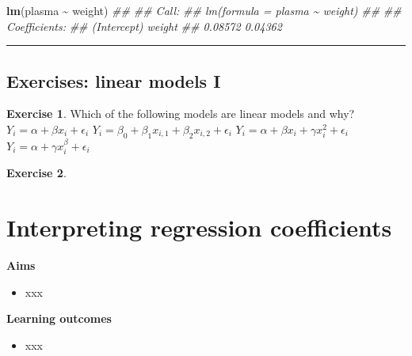 \documentclass[
]{book}
\newenvironment{Shaded}{\begin{snugshade}}{\end{snugshade}}
\newcommand{\CommentTok}[1]{\textcolor[rgb]{0.56,0.35,0.01}{\textit{#1}}}
\newcommand{\KeywordTok}[1]{\textcolor[rgb]{0.13,0.29,0.53}{\textbf{#1}}}
\newcommand{\NormalTok}[1]{#1}
\newcommand{\OperatorTok}[1]{\textcolor[rgb]{0.81,0.36,0.00}{\textbf{#1}}}
\newcommand{\StringTok}[1]{\textcolor[rgb]{0.31,0.60,0.02}{#1}}
\providecommand{\tightlist}{%
  \setlength{\itemsep}{0pt}\setlength{\parskip}{0pt}}
\theoremstyle{definition}
\theoremstyle{definition}
\theoremstyle{definition}
\newtheorem{exercise}{Exercise}[chapter]
\theoremstyle{remark}
\begin{document}
\begin{Shaded}
\begin{Highlighting}[]

\KeywordTok{lm}\NormalTok{(plasma }\OperatorTok{\textasciitilde{}}\StringTok{ }\NormalTok{weight)}
\CommentTok{\#\# }
\CommentTok{\#\# Call:}
\CommentTok{\#\# lm(formula = plasma \textasciitilde{} weight)}
\CommentTok{\#\# }
\CommentTok{\#\# Coefficients:}
\CommentTok{\#\# (Intercept)       weight  }
\CommentTok{\#\#     0.08572      0.04362}
\end{Highlighting}
\end{Shaded}

\begin{center}\rule{0.5\linewidth}{0.5pt}\end{center}

\hypertarget{exercises-linear-models-i}{%
\section{Exercises: linear models I}\label{exercises-linear-models-i}}

\begin{exercise}
\protect\hypertarget{exr:lm-recognize}{}{\label{exr:lm-recognize} }Which of the following models are linear models and why?
\(Y_i=\alpha + \beta x_i + \epsilon_i\)
\(Y_i=\beta_0 + \beta_1 x_{i,1} + \beta_2 x_{i,2} + \epsilon_i\)
\(Y_i=\alpha + \beta x_i + \gamma x_i^2 + \epsilon_i\)
\(Y_i=\alpha + \gamma x_i^\beta + \epsilon_i\)
\end{exercise}

\begin{exercise}
\protect\hypertarget{exr:lm-calculus}{}{\label{exr:lm-calculus} }
\end{exercise}

\hypertarget{interpreting-regression-coefficients}{%
\chapter{Interpreting regression coefficients}\label{interpreting-regression-coefficients}}

\textbf{Aims}

\begin{itemize}
\tightlist
\item
  xxx
\end{itemize}

\textbf{Learning outcomes}

\begin{itemize}
\tightlist
\item
  xxx
\end{itemize}
\end{document}
